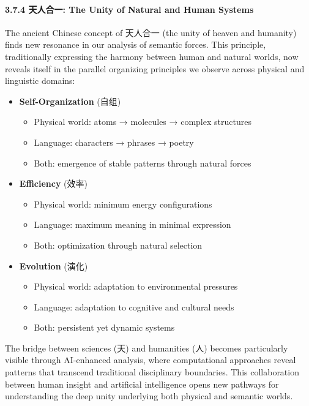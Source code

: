 \documentclass[
  11pt,
  letterpaper,
]{article}
\providecommand{\tightlist}{%
  \setlength{\itemsep}{0pt}\setlength{\parskip}{0pt}}
\begin{document}
\paragraph{3.7.4 天人合一: The Unity of Natural and Human
Systems}\label{ux5929ux4ebaux5408ux4e00-the-unity-of-natural-and-human-systems}

The ancient Chinese concept of 天人合一 (the unity of heaven and
humanity) finds new resonance in our analysis of semantic forces. This
principle, traditionally expressing the harmony between human and
natural worlds, now reveals itself in the parallel organizing principles
we observe across physical and linguistic domains:

\begin{itemize}
\tightlist
\item
  \textbf{Self-Organization} (自组)

  \begin{itemize}
  \tightlist
  \item
    Physical world: atoms → molecules → complex structures
  \item
    Language: characters → phrases → poetry
  \item
    Both: emergence of stable patterns through natural forces
  \end{itemize}
\item
  \textbf{Efficiency} (效率)

  \begin{itemize}
  \tightlist
  \item
    Physical world: minimum energy configurations
  \item
    Language: maximum meaning in minimal expression
  \item
    Both: optimization through natural selection
  \end{itemize}
\item
  \textbf{Evolution} (演化)

  \begin{itemize}
  \tightlist
  \item
    Physical world: adaptation to environmental pressures
  \item
    Language: adaptation to cognitive and cultural needs
  \item
    Both: persistent yet dynamic systems
  \end{itemize}
\end{itemize}

The bridge between sciences (天) and humanities (人) becomes
particularly visible through AI-enhanced analysis, where computational
approaches reveal patterns that transcend traditional disciplinary
boundaries. This collaboration between human insight and artificial
intelligence opens new pathways for understanding the deep unity
underlying both physical and semantic worlds.
\end{document}
